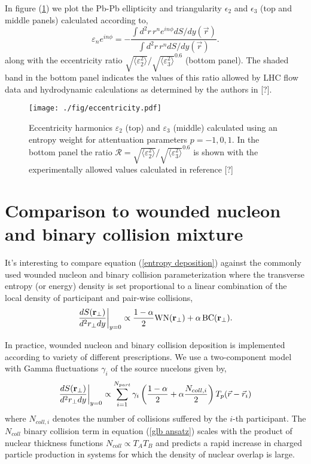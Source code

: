 \documentclass[aps,prl,reprint,amsmath,nofootinbib]{revtex4-1}
\begin{document}
In figure (\ref{fig:eccen}) we plot the Pb-Pb ellipticity and triangularity $\epsilon_2$ and $\epsilon_3$ (top and middle panels) calculated according to,
\begin{equation}
 \varepsilon_n e^{i n\phi} = -\frac{\int d^2r\, r^n e^{i n \phi} dS/dy(\vec{r})}{\int d^2r\, r^n dS/dy(\vec{r})}.
\end{equation}
along with the eccentricity ratio $\sqrt{\langle \varepsilon_2^2 \rangle}/\sqrt{\langle \varepsilon_3^2 \rangle}^{0.6}$ (bottom panel). The shaded band in the bottom 
panel indicates the values of this ratio allowed by LHC flow data and hydrodynamic calculations as determined by the authors in [?].

\begin{figure}[t]
 \texttt{[image: ./fig/eccentricity.pdf]}
  \caption{\label{fig:eccen} Eccentricity harmonics $\varepsilon_2$ (top) and $\varepsilon_3$ (middle) calculated using an entropy weight for attentuation parameters $p=-1,0,1$. 
  In the bottom panel the ratio $\mathcal{R} = \sqrt{\langle \varepsilon_2^2 \rangle}/\sqrt{\langle \varepsilon_3^2 \rangle}^{0.6}$ is shown with the experimentally allowed values calculated in reference [?]}
\end{figure}

\section{Comparison to wounded nucleon and binary collision mixture}

It's interesting to compare equation (\ref{entropy deposition}) against the commonly used wounded nucleon and binary collision parameterization where the 
transverse entropy (or energy) density is set proportional to a linear combination of the local density of participant and pair-wise collisions,
\begin{equation}
 \label{glb ansatz}
 \frac{dS({\bf r}_\perp)}{d^2r_\perp dy} \biggr \rvert_{y=0}  \propto \frac{1-\alpha}{2}\mbox{WN}({\bf r_\perp}) + \alpha\, \mbox{BC}({\bf r_\perp}). 
\end{equation}

In practice, wounded nucleon and binary collision deposition is implemented according to variety of different prescriptions. We use a two-component model
with Gamma fluctuations $\gamma_i$ of the source nucelons given by,
\begin{equation}
 \label{glb algorithm}
 \frac{dS({\bf r}_\perp)}{d^2r_\perp dy} \biggr \rvert_{y=0}  \propto \sum\limits_{i=1}^{N_{part}} \gamma_i \left(\frac{1-\alpha}{2} + \alpha \frac{N_{coll,i}}{2} \right ) T_p(\vec{r}-\vec{r}_i)
\end{equation}
where $N_{coll,i}$ denotes the number of collisions suffered by the $i$-th participant. The $N_{coll}$ binary collision term in equation (\ref{glb ansatz}) scales with the product of nuclear thickness 
functions $N_{coll} \propto T_A T_B$ and predicts a rapid increase in charged particle production in systems for which the density of nuclear overlap is large.  
\end{document}
